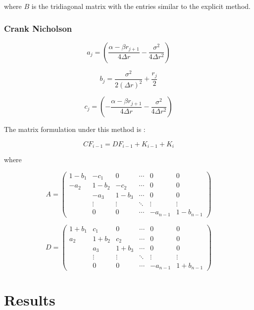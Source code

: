 \documentclass[12pt,a4paper]{article}
\begin{document}
where $B$ is the tridiagonal matrix with the entries similar to the explicit method.

\subsubsection{Crank Nicholson}

$$a_{j}=(\frac{\alpha-\beta r_{j+1}}{4\Delta r} - \frac{\sigma^2}{4\Delta r^2}) $$

$$b_{j}= \frac{\sigma^2}{2 (\Delta r)^2}+\frac{r_{j}}{2}$$

$$c_{j}=(-\frac{\alpha-\beta r_{j+1}}{4\Delta r} - \frac{\sigma^2}{4\Delta r^2}) $$

The matrix formulation under this method is :

$$CF_{i-1}=DF_{i-1}+K_{i-1}+K_{i}$$

where

$$ A= \left( \begin{array}{cccccc}
1-b_{1} & -c_{1} & 0 & \cdots  & 0 & 0\\
-a_{2} & 1-b_{2} & -c_{2} &\cdots & 0 & 0 \\
& -a_{3} & 1-b_{3} & \cdots & 0 & 0  \\
& \vdots &\vdots & \ddots & \vdots & \vdots \\ 
& 0 & 0 & \cdots & -a_{n-1} & 1-b_{n-1} \end{array} \right) $$

$$ D= \left( \begin{array}{cccccc}
1+b_{1} & c_{1} & 0 & \cdots  & 0 & 0\\
a_{2} & 1+b_{2} & c_{2} &\cdots & 0 & 0 \\
& a_{3} & 1+b_{3} & \cdots & 0 & 0  \\
& \vdots &\vdots & \ddots & \vdots & \vdots \\ 
& 0 & 0 & \cdots & -a_{n-1} & 1+b_{n-1} \end{array} \right) $$


\newpage
\section{Results}
\label{sec: Results}
\end{document}
